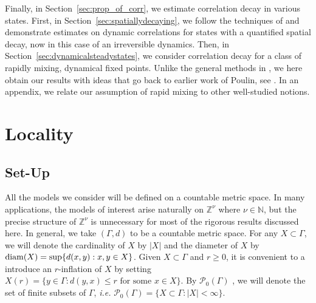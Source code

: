 \documentclass{article}
\newcommand{\<}{\langle}
\renewcommand{\>}{\rangle}
\numberwithin{equation}{section}
\theoremstyle{definition}
\begin{document}
Finally, in Section~\ref{sec:prop_of_corr}, we estimate correlation decay in various states. First, in Section~\ref{sec:spatiallydecaying}, we follow
the techniques of \cite{NachtergaeleOgataSims} and demonstrate 
estimates on dynamic correlations for states with a quantified spatial decay, now in this case of an irreversible dynamics. 
Then, in Section~\ref{sec:dynamicalsteadystates}, we consider correlation decay for a class of rapidly mixing, dynamical fixed points. 
Unlike the general methods in \cite{KastoryanoEisert}, we here obtain our results 
with ideas that go back to earlier work of Poulin, see \cite{Poulin}. In an appendix, we 
relate our assumption of rapid mixing to other well-studied notions.   


\section{Locality}\label{Locality}
\subsection{Set-Up} \label{sec:set-up}

All the models we consider will be defined on a countable metric space.
In many applications, the models of interest arise naturally on $\mathbb{Z}^{\nu}$ where $\nu \in \mathbb{N}$, but
the precise structure of $\mathbb{Z}^{\nu}$ is unnecessary for most of the rigorous results discussed here. In general, we take 
$(\Gamma, d)$ to be a countable metric space. For any $X \subset \Gamma$, we will denote
the cardinality of $X$ by $|X|$ and the diameter of $X$ by ${\rm diam}(X) = \sup\{ d(x,y) : x,y \in X\}$.
Given $X \subset \Gamma$ and $r \geq 0$, it is convenient to a introduce an $r$-inflation of $X$ by setting 
$X(r) = \{ y \in \Gamma : d(y,x) \leq r \mbox{ for some } x \in X \}$. By $\mathcal{P}_0( \Gamma)$ , we will denote 
the set of finite subsets of $\Gamma$, \textit{i.e.} $\mathcal{P}_0(\Gamma) = \{ X \subset \Gamma : |X| < \infty \}$. 
\end{document}
